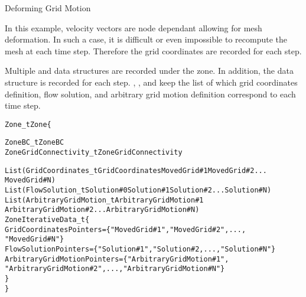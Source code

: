 \enlargethispage{\baselineskip}
\begin{example}{Deforming Grid Motion}
\label{ex:deformingmotion}

In this example, velocity vectors are node dependant allowing for mesh
deformation.
In such a case, it is difficult or even impossible to recompute the mesh
at each time step.
Therefore the grid coordinates are recorded for each step.

Multiple  and  data
structures are recorded under the zone.
In addition, the data structure  is recorded
for each step.
, , and
 keep the list of which grid
coordinates definition, flow solution, and arbitrary grid motion
definition correspond to each time step.

\begin{alltt}
  Zone\_t Zone \{

    ZoneBC\_t ZoneBC
    ZoneGridConnectivity\_t ZoneGridConnectivity

    List ( GridCoordinates\_t GridCoordinates MovedGrid\#1 MovedGrid\#2 ...
           MovedGrid\#N )
    List ( FlowSolution\_t Solution\#0 Solution\#1 Solution\#2 ... Solution\#N )
    List ( ArbitraryGridMotion\_t ArbitraryGridMotion\#1 
           ArbitraryGridMotion\#2 ... ArbitraryGridMotion\#N )
    ZoneIterativeData\_t \{
      GridCoordinatesPointers = \{"MovedGrid\#1", "MovedGrid\#2", ...,
         "MovedGrid\#N"\}
      FlowSolutionPointers = \{"Solution\#1", "Solution\#2, ..., "Solution\#N"\}
      ArbitraryGridMotionPointers = \{"ArbitraryGridMotion\#1",
         "ArbitraryGridMotion\#2", ..., "ArbitraryGridMotion\#N"\}
    \}
  \}
\end{alltt}
\end{example}

